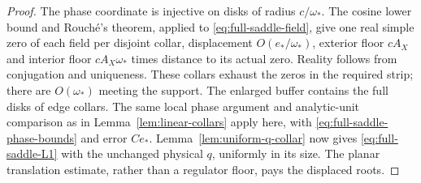 \begin{proof}
The phase coordinate is injective on disks of radius $c/\omega_*$.
The cosine lower bound and Rouch\'e's theorem, applied to
\eqref{eq:full-saddle-field}, give one real simple zero of each field
per disjoint collar, displacement $O(e_*/\omega_*)$, exterior floor
$cA_X$ and interior floor $cA_X\omega_*$ times distance to its actual
zero. Reality follows from conjugation and uniqueness. These collars
exhaust the zeros in the required strip; there are $O(\omega_*)$
meeting the support. The enlarged buffer contains the full disks of
edge collars. The same local phase argument and analytic-unit comparison
as in Lemma~\ref{lem:linear-collars} apply here, with
\eqref{eq:full-saddle-phase-bounds} and error $Ce_*$.
Lemma~\ref{lem:uniform-q-collar} now gives
\eqref{eq:full-saddle-L1} with the unchanged physical $q$, uniformly in
its size. The planar translation estimate, rather than a regulator
floor, pays the displaced roots.
\end{proof}

